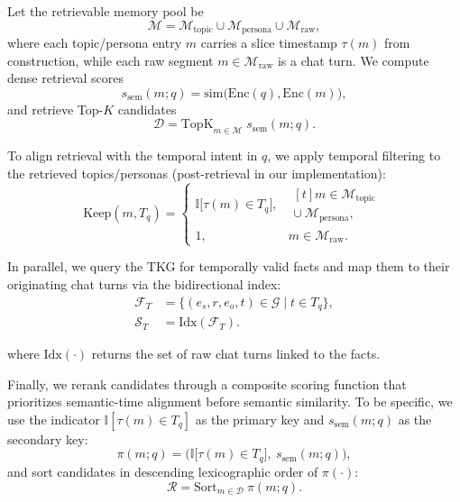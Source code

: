 \documentclass[11pt]{article}
\begin{document}
Let the retrievable memory pool be
\begin{equation}
\mathcal{M} = \mathcal{M}_{\mathrm{topic}} \cup \mathcal{M}_{\mathrm{persona}} \cup \mathcal{M}_{\mathrm{raw}},
\end{equation}
where each topic/persona entry $m$ carries a slice timestamp $\tau(m)$ from construction, while each raw segment $m \in \mathcal{M}_{\mathrm{raw}}$ is a chat turn. We compute dense retrieval scores 
\begin{equation} s_{\mathrm{sem}}(m;q) = \mathrm{sim}\big(\mathrm{Enc}(q), \mathrm{Enc}(m)\big), \end{equation} 
and retrieve Top-$K$ candidates \begin{equation} \mathcal{D} = \mathrm{TopK}_{m \in \mathcal{M}} \; s_{\mathrm{sem}}(m;q). 
\end{equation}

To align retrieval with the temporal intent in $q$, we apply temporal filtering to the retrieved topics/personas (post-retrieval in our implementation):
\begin{equation}
\mathrm{Keep}(m,T_q)=
\begin{cases}
\mathbb{I}\!\big[\tau(m) \in T_q\big], &
\begin{aligned}[t]
m \in \mathcal{M}_{\mathrm{topic}}\\
\cup\ \mathcal{M}_{\mathrm{persona}},
\end{aligned}\\[4pt]
1, & m \in \mathcal{M}_{\mathrm{raw}}.
\end{cases}
\end{equation}

In parallel, we query the TKG for temporally valid facts and map them to their originating  chat turns via the bidirectional index:
\begin{equation}
\begin{aligned}
\mathcal{F}_T &= \{ (e_s,r,e_o,t)\in \mathcal{G} \mid t \in T_q \}, \\
\mathcal{S}_T &= \mathrm{Idx}(\mathcal{F}_T).
\end{aligned}
\end{equation}

where $\mathrm{Idx}(\cdot)$ returns the set of raw chat turns linked to the facts.

Finally, we rerank candidates through a composite scoring function that prioritizes semantic-time alignment before semantic similarity. To be specific, we use the indicator $\mathbb{I}[\tau(m)\in T_q]$ as the primary key and $s_{\mathrm{sem}}(m;q)$ as the secondary key:
\begin{equation}
\pi(m;q)=\Big(\mathbb{I}\big[\tau(m)\in T_q\big],\ s_{\mathrm{sem}}(m;q)\Big),
\end{equation}
and sort candidates in descending lexicographic order of $\pi(\cdot)$:
\begin{equation}
\mathcal{R}=\mathrm{Sort}_{m\in\mathcal{D}}\ \pi(m;q).
\end{equation}
\end{document}
